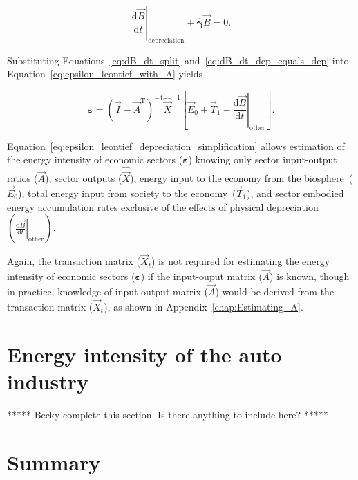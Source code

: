 \begin{equation} \label{eq:dB_dt_dep_equals_dep}
	\left. \frac{\mathrm{d}\vec{B}}{\mathrm{d}t} \right|_{\mathrm{depreciation}} 
	+ \hat{\bm{\gamma}}\vec{B}
	= 0.
\end{equation}

\noindent{}Substituting Equations~\ref{eq:dB_dt_split} and~\ref{eq:dB_dt_dep_equals_dep}
into Equation~\ref{eq:epsilon_leontief_with_A} yields

\begin{equation} \label{eq:epsilon_leontief_depreciation_simplification}
	\bm{\varepsilon} 
	= {(\vec{I} - \vec{A}^{\mathrm{T}})}^{-1}\hat{\vec{X}}^{-1}
		\left[\vec{E}_{0} 
				+ \vec{T}_{1} 
				- \left. \frac{\mathrm{d}\vec{B}}{\mathrm{d}t} \right|_{\mathrm{other}}
		\right].
\end{equation}

\noindent{}Equation~\ref{eq:epsilon_leontief_depreciation_simplification} 
allows estimation of the energy intensity 
of economic sectors ($\bm{\varepsilon}$) 
knowing only 
sector input-output ratios ($\vec{A}$), 
sector outputs ($\hat{\vec{X}}$), 
energy input to the economy from the biosphere~($\vec{E}_{0}$), 
total energy input from society to the economy~($\vec{T}_{1}$), and
sector embodied energy accumulation rates
exclusive of the effects of physical
depreciation~$\left( \left. \frac{\mathrm{d}\vec{B}}{\mathrm{d}t} \right|_{\mathrm{other}} \right)$.

Again, the transaction matrix ($\vec{X}_{t}$) 
is not required for estimating the energy intensity 
of economic sectors ($\bm{\varepsilon}$)
if the input-ouput matrix ($\vec{A}$) is known, 
though in practice, 
knowledge of input-output matrix ($\vec{A}$) 
would be derived from the transaction matrix ($\vec{X}_{t}$),
as shown in Appendix~\ref{chap:Estimating_A}.


\section{Energy intensity of the auto industry}
\label{sec:intensity_auto}

***** Becky complete this section. Is there anything to include here? *****

\section{Summary}
\label{sec:intensity_summary}






